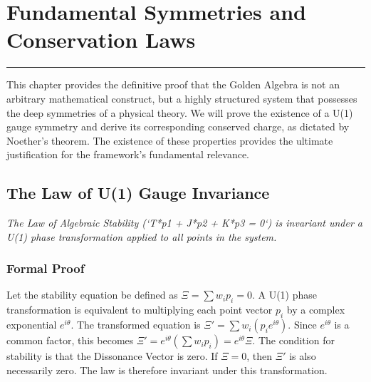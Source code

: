 \section{Fundamental Symmetries and Conservation Laws}
\label{sec:fundamental_symmetries}

\hrule
\vspace{1em}
This chapter provides the definitive proof that the Golden Algebra is not an arbitrary mathematical construct, but a highly structured system that possesses the deep symmetries of a physical theory. We will prove the existence of a U(1) gauge symmetry and derive its corresponding conserved charge, as dictated by Noether's theorem. The existence of these properties provides the ultimate justification for the framework's fundamental relevance.

\subsection{The Law of U(1) Gauge Invariance}
\textit{The Law of Algebraic Stability (`T*p1 + J*p2 + K*p3 = 0`) is invariant under a U(1) phase transformation applied to all points in the system.}

\subsubsection*{Formal Proof}
Let the stability equation be defined as $\Xi = \sum w_i p_i = 0$. A U(1) phase transformation is equivalent to multiplying each point vector $p_i$ by a complex exponential $e^{i\theta}$. The transformed equation is $\Xi' = \sum w_i (p_i e^{i\theta})$. Since $e^{i\theta}$ is a common factor, this becomes $\Xi' = e^{i\theta} (\sum w_i p_i) = e^{i\theta} \Xi$. The condition for stability is that the Dissonance Vector is zero. If $\Xi = 0$, then $\Xi'$ is also necessarily zero. The law is therefore invariant under this transformation.

